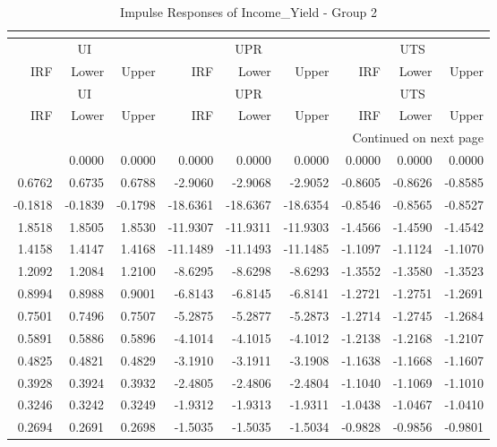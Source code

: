 \begin{longtable}{rrrrrrrrr}
\caption{Impulse Responses of Income_Yield - Group 2}\\
\label{tab:iy_irf_group2}\\
\toprule
\multicolumn{3}{c}{UI} & \multicolumn{3}{c}{UPR} & \multicolumn{3}{c}{UTS} \\
IRF & Lower & Upper & IRF & Lower & Upper & IRF & Lower & Upper \\
\midrule
\endfirsthead
\toprule
\multicolumn{3}{c}{UI} & \multicolumn{3}{c}{UPR} & \multicolumn{3}{c}{UTS} \\
IRF & Lower & Upper & IRF & Lower & Upper & IRF & Lower & Upper \\
\midrule
\endhead
\midrule
\multicolumn{9}{r}{Continued on next page} \\
\midrule
\endfoot
\bottomrule
\endlastfoot
0.0000 & 0.0000 & 0.0000 & 0.0000 & 0.0000 & 0.0000 & 0.0000 & 0.0000 & 0.0000 \\
0.6762 & 0.6735 & 0.6788 & -2.9060 & -2.9068 & -2.9052 & -0.8605 & -0.8626 & -0.8585 \\
-0.1818 & -0.1839 & -0.1798 & -18.6361 & -18.6367 & -18.6354 & -0.8546 & -0.8565 & -0.8527 \\
1.8518 & 1.8505 & 1.8530 & -11.9307 & -11.9311 & -11.9303 & -1.4566 & -1.4590 & -1.4542 \\
1.4158 & 1.4147 & 1.4168 & -11.1489 & -11.1493 & -11.1485 & -1.1097 & -1.1124 & -1.1070 \\
1.2092 & 1.2084 & 1.2100 & -8.6295 & -8.6298 & -8.6293 & -1.3552 & -1.3580 & -1.3523 \\
0.8994 & 0.8988 & 0.9001 & -6.8143 & -6.8145 & -6.8141 & -1.2721 & -1.2751 & -1.2691 \\
0.7501 & 0.7496 & 0.7507 & -5.2875 & -5.2877 & -5.2873 & -1.2714 & -1.2745 & -1.2684 \\
0.5891 & 0.5886 & 0.5896 & -4.1014 & -4.1015 & -4.1012 & -1.2138 & -1.2168 & -1.2107 \\
0.4825 & 0.4821 & 0.4829 & -3.1910 & -3.1911 & -3.1908 & -1.1638 & -1.1668 & -1.1607 \\
0.3928 & 0.3924 & 0.3932 & -2.4805 & -2.4806 & -2.4804 & -1.1040 & -1.1069 & -1.1010 \\
0.3246 & 0.3242 & 0.3249 & -1.9312 & -1.9313 & -1.9311 & -1.0438 & -1.0467 & -1.0410 \\
0.2694 & 0.2691 & 0.2698 & -1.5035 & -1.5035 & -1.5034 & -0.9828 & -0.9856 & -0.9801 \\
\end{longtable}